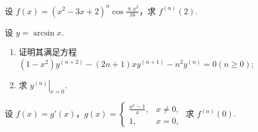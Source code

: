 	\begin{ti}
		设 $f(x) = \left( x^{2} - 3x + 2 \right)^{n} \cos \frac{\uppi x^{2}}{16}$，求 $f^{(n)}(2)$.
	\end{ti}

	\begin{ti}
		设 $y = \arcsin x$.
		\begin{enumerate}
			\item 证明其满足方程 $\left( 1 - x^{2} \right) y^{(n+2)} - (2n + 1) x y^{(n+1)} - n^{2} y^{(n)} = 0 (n \geq 0)$;
			\item 求 $\left. y^{(n)} \right|_{x = 0}$.
		\end{enumerate}
	\end{ti}

	\begin{ti}
		设 $f(x) = g'(x)$，$g(x) = \begin{cases}
			\frac{\ee^{x} - 1}{x}, & x \ne 0,\\
			1, & x = 0,
		\end{cases}$ 求 $f^{(n)}(0)$.
	\end{ti}
